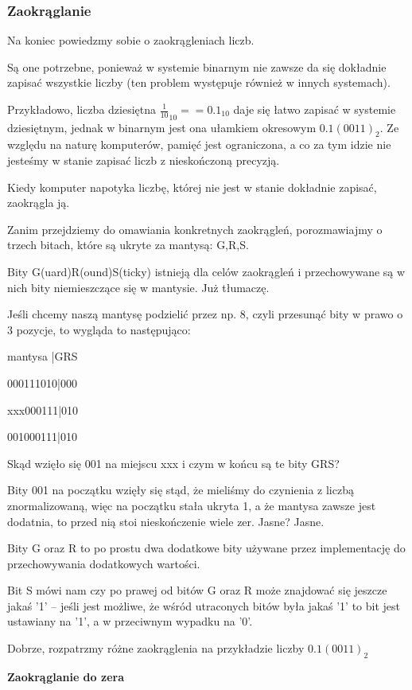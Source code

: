 \subsubsection{Zaokrąglanie}
Na koniec powiedzmy sobie o zaokrągleniach liczb.

Są one potrzebne, ponieważ w systemie binarnym nie zawsze da się dokładnie zapisać wszystkie liczby (ten problem występuje również w innych systemach).

Przykładowo, liczba dziesiętna $\frac{1}{10}_{10} == 0.1_{10}$ daje się łatwo zapisać w systemie dziesiętnym, jednak w binarnym jest ona ułamkiem okresowym $0.1(0011)_2$.
Ze względu na naturę komputerów, pamięć jest ograniczona, a co za tym idzie nie jesteśmy w stanie zapisać liczb z nieskończoną precyzją.

Kiedy komputer napotyka liczbę, której nie jest w stanie dokładnie zapisać, zaokrągla ją.

Zanim przejdziemy do omawiania konkretnych zaokrągleń, porozmawiajmy o trzech bitach, które są ukryte za mantysą: G,R,S.

Bity G(uard)R(ound)S(ticky) istnieją dla celów zaokrągleń i przechowywane są w nich bity niemieszczące się w mantysie. Już tłumaczę.

Jeśli chcemy naszą mantysę podzielić przez np. 8, czyli przesunąć bity w prawo o 3 pozycje, to wygląda to następująco:

mantysa |GRS
 
000111010|000

xxx000111|010

001000111|010

Skąd wzięło się 001 na miejscu xxx i czym w końcu są te bity GRS?

Bity 001 na początku wzięły się stąd, że mieliśmy do czynienia z liczbą znormalizowaną, więc na początku stała ukryta 1, a że mantysa zawsze jest dodatnia, to przed nią stoi nieskończenie wiele zer.
Jasne? Jasne.

Bity G oraz R to po prostu dwa dodatkowe bity używane przez implementację do przechowywania dodatkowych wartości.

Bit S mówi nam czy po prawej od bitów G oraz R może znajdować się jeszcze jakaś '1' -- jeśli jest możliwe, że wśród utraconych bitów była jakaś '1' to bit jest ustawiany na '1', a w przeciwnym wypadku na '0'.

Dobrze, rozpatrzmy różne zaokrąglenia na przykładzie liczby $0.1(0011)_2$

\textbf{Zaokrąglanie do zera}

